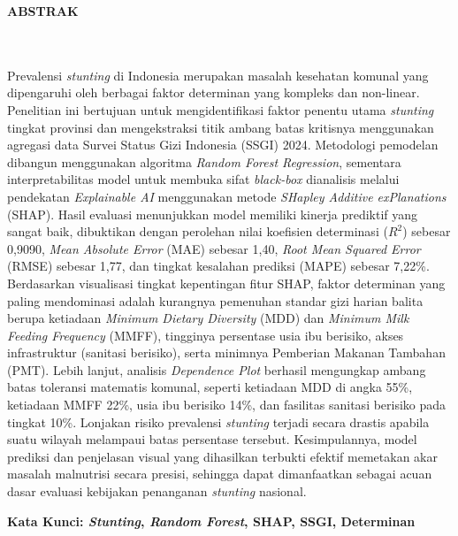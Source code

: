 \clearpage
{}%
\thispagestyle{fancy}

\begin{center}
    \large \bfseries \MakeUppercase{Abstrak}\\
    \normalsize \normalfont {\thetitle}\\
    \normalsize \normalfont {\theauthor}\\
    \bigskip
    
    \normalsize \normalfont \justifying \singlespacing
    Prevalensi \textit{stunting} di Indonesia merupakan masalah kesehatan komunal yang dipengaruhi oleh berbagai faktor determinan yang kompleks dan non-linear. Penelitian ini bertujuan untuk mengidentifikasi faktor penentu utama \textit{stunting} tingkat provinsi dan mengekstraksi titik ambang batas kritisnya menggunakan agregasi data Survei Status Gizi Indonesia (SSGI) 2024. Metodologi pemodelan dibangun menggunakan algoritma \textit{Random Forest Regression}, sementara interpretabilitas model untuk membuka sifat \textit{black-box} dianalisis melalui pendekatan \textit{Explainable AI} menggunakan metode \textit{SHapley Additive exPlanations} (SHAP). Hasil evaluasi menunjukkan model memiliki kinerja prediktif yang sangat baik, dibuktikan dengan perolehan nilai koefisien determinasi ($R^2$) sebesar 0,9090, \textit{Mean Absolute Error} (MAE) sebesar 1,40, \textit{Root Mean Squared Error} (RMSE) sebesar 1,77, dan tingkat kesalahan prediksi (MAPE) sebesar 7,22\%. Berdasarkan visualisasi tingkat kepentingan fitur SHAP, faktor determinan yang paling mendominasi adalah kurangnya pemenuhan standar gizi harian balita berupa ketiadaan \textit{Minimum Dietary Diversity} (MDD) dan \textit{Minimum Milk Feeding Frequency} (MMFF), tingginya persentase usia ibu berisiko, akses infrastruktur (sanitasi berisiko), serta minimnya Pemberian Makanan Tambahan (PMT). Lebih lanjut, analisis \textit{Dependence Plot} berhasil mengungkap ambang batas toleransi matematis komunal, seperti ketiadaan MDD di angka 55\%, ketiadaan MMFF 22\%, usia ibu berisiko 14\%, dan fasilitas sanitasi berisiko pada tingkat 10\%. Lonjakan risiko prevalensi \textit{stunting} terjadi secara drastis apabila suatu wilayah melampaui batas persentase tersebut. Kesimpulannya, model prediksi dan penjelasan visual yang dihasilkan terbukti efektif memetakan akar masalah malnutrisi secara presisi, sehingga dapat dimanfaatkan sebagai acuan dasar evaluasi kebijakan penanganan \textit{stunting} nasional.\par

    \vspace{20pt}
    \raggedright \textbf{Kata Kunci: \textit{Stunting}, \textit{Random Forest}, SHAP, SSGI, Determinan}
    
    \vfill
    
\end{center}
\clearpage